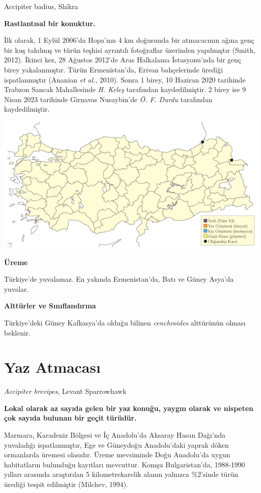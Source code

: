 \documentclass[
  a4paper,
  DIV=11,
  numbers=noendperiod]{scrreprt}
\begin{document}
Accipiter badius, Shikra

\textbf{Rastlantısal bir konuktur.}

İlk olarak, 1 Eylül 2006'da Hopa'nın 4 km doğusunda bir atmacacının
ağına genç bir kuş takılmış ve türün teşhisi ayrıntılı fotoğraflar
üzerinden yapılmıştır (Smith, 2012). İkinci kez, 28 Ağustos 2012'de Aras
Halkalama İstasyonu'nda bir genç birey yakalanmıştır. Türün
Ermenistan'da, Erivan bahçelerinde ürediği ispatlanmıştır (Ananian
\emph{et al.}, 2010). Sonra 1 birey, 10 Haziran 2020 tarihinde Trabzon
Sancak Mahallesinde \emph{H. Keleş} tarafından kaydedilmiştir. 2 birey
ise 9 Nisan 2023 tarihinde Girnavas Nusaybin'de \emph{Ö. F. Durdu}
tarafından kaydedilmiştir.

\includegraphics{images/harita_Page_098.png}

\textbf{Üreme}

Türkiye'de yuvalamaz. En yakında Ermenistan'da, Batı ve Güney Asya'da
yuvalar.

\textbf{Alttürler ve Sınıflandırma}

Türkiye'deki Güney Kafkasya'da olduğu bilinen \emph{cenchroides}
alttürünün olması beklenir.

\section{Yaz Atmacası}\label{yaz-atmacasux131}

\emph{Accipiter brevipes}, Levant Sparrowhawk

\textbf{Lokal olarak az sayıda gelen bir yaz konuğu, yaygın olarak ve
nispeten çok sayıda bulunan bir geçit türüdür.}

Marmara, Karadeniz Bölgesi ve İç Anadolu'da Aksaray Hasan Dağı'nda
yuvaladığı ispatlanmıştır, Ege ve Güneydoğu Anadolu'daki yaprak döken
ormanlarda üremesi olasıdır. Üreme mevsiminde Doğu Anadolu'da uygun
habitatların bulunduğu kayıtları mevcuttur. Komşu Bulgaristan'da,
1988-1990 yılları arasında araştırılan 5 kilometrekarelik alanın
yalnızca \%2'sinde türün ürediği tespit edilmiştir (Milchev, 1994).
\end{document}
